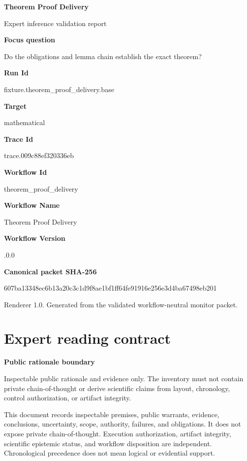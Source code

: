 \documentclass[10pt,a4paper]{article}
\newcommand{\TraceField}[2]{\par\noindent\textbf{#1}\par\noindent #2\par\smallskip}
\begin{document}
\hypersetup{pageanchor=false}
\begin{titlepage}
\centering
{\LARGE\bfseries Theorem Proof Delivery\par}
\vspace{1em}
{\large Expert inference validation report\par}
\vspace{2em}
\begin{minipage}{0.92\linewidth}
\TraceField{Focus question}{Do the obligation\allowbreak{}s and lemma chain establish the exact theorem?}

\TraceField{Run Id}{fixture.\allowbreak{}theorem\_\allowbreak{}proof\_\allowbreak{}delivery.\allowbreak{}base}

\TraceField{Target}{mathematic\allowbreak{}al}

\TraceField{Trace Id}{trace.\allowbreak{}009c88ef32\allowbreak{}0336eb}

\TraceField{Workflow Id}{theorem\_\allowbreak{}proof\_\allowbreak{}delivery}

\TraceField{Workflow Name}{Theorem Proof Delivery}

\TraceField{Workflow Version}{1.\allowbreak{}0.\allowbreak{}0}

\TraceField{Canonical packet SHA-256}{607ba13348\allowbreak{}ec6b13a20c\allowbreak{}3c1d9f8ae1\allowbreak{}bf1ff64fe9\allowbreak{}1916e256e3\allowbreak{}d4ba67498e\allowbreak{}b201}

\end{minipage}
\vfill
{\small Renderer 1.0. Generated from the validated workflow-neutral monitor packet.}
\end{titlepage}
\tableofcontents\clearpage
\hypersetup{pageanchor=true}
\section{Expert reading contract}\label{sec-reading-contract}
\TraceField{Public rationale boundary}{Inspectabl\allowbreak{}e public rationale and evidence only.\allowbreak{} The inventory must not contain private chain-\allowbreak{}of-\allowbreak{}thought or derive scientific\allowbreak{} claims from layout, chronology\allowbreak{}, control authorizat\allowbreak{}ion, or artifact integrity.\allowbreak{}}

This document records inspectable premises, public warrants, evidence, conclusions,
uncertainty, scope, authority, failures, and obligations. It does not expose private
chain-of-thought. Execution authorization, artifact integrity, scientific epistemic
status, and workflow disposition are independent. Chronological precedence does not
mean logical or evidential support.
\end{document}
